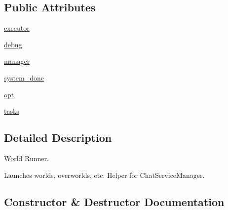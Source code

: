 \subsection*{Public Attributes}
\begin{DoxyCompactItemize}
\item 
\hyperlink{classparlai_1_1chat__service_1_1core_1_1manager__utils_1_1ChatServiceWorldRunner_aa9cd644d7c035fcb41980005d259947f}{executor}
\item 
\hyperlink{classparlai_1_1chat__service_1_1core_1_1manager__utils_1_1ChatServiceWorldRunner_af71184b9bb3dc433adfd678b7a8097e7}{debug}
\item 
\hyperlink{classparlai_1_1chat__service_1_1core_1_1manager__utils_1_1ChatServiceWorldRunner_aebacdd9b5d3ab6a093945f22e0fe0a83}{manager}
\item 
\hyperlink{classparlai_1_1chat__service_1_1core_1_1manager__utils_1_1ChatServiceWorldRunner_a4fcbda4053e9103d38301f0039674ed9}{system\+\_\+done}
\item 
\hyperlink{classparlai_1_1chat__service_1_1core_1_1manager__utils_1_1ChatServiceWorldRunner_aa4e0d4e5b87f4c136b0750cea2c339be}{opt}
\item 
\hyperlink{classparlai_1_1chat__service_1_1core_1_1manager__utils_1_1ChatServiceWorldRunner_a09f6b502ea55829cd883a8ef4e9ac6d4}{tasks}
\end{DoxyCompactItemize}


\subsection{Detailed Description}
\begin{DoxyVerb}World Runner.

Launches worlds, overworlds, etc. Helper for ChatServiceManager.
\end{DoxyVerb}
 

\subsection{Constructor \& Destructor Documentation}
\mbox{\label{classparlai_1_1chat__service_1_1core_1_1manager__utils_1_1ChatServiceWorldRunner_a01462412e195b5788e5cfd3a769f0c0d}} 
